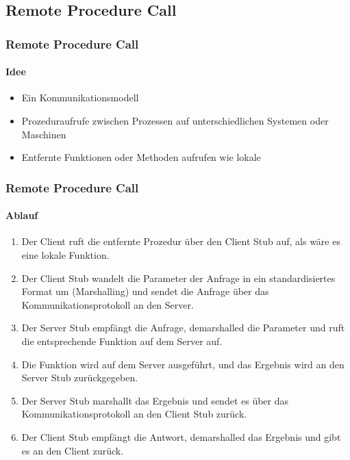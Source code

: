 \subsection{Remote Procedure Call}
\begin{frame}
  \frametitle{Remote Procedure Call}
  \framesubtitle{Idee}
  \begin{itemize}
    \item Ein Kommunikationsmodell
    \item Prozeduraufrufe zwischen Prozessen auf unterschiedlichen Systemen oder Maschinen
    \item Entfernte Funktionen oder Methoden aufrufen wie lokale
  \end{itemize}
\end{frame}


\begin{frame}
  \frametitle{Remote Procedure Call}
  \framesubtitle{Ablauf}
  \begin{enumerate} 
  \item Der Client ruft die entfernte Prozedur über den Client Stub auf, als wäre es eine lokale Funktion.
  \item Der Client Stub wandelt die Parameter der Anfrage in ein standardisiertes Format um (Marshalling) und sendet die Anfrage über das Kommunikationsprotokoll an den Server.
  \item Der Server Stub empfängt die Anfrage, demarshalled die Parameter und ruft die entsprechende Funktion auf dem Server auf.
  \item Die Funktion wird auf dem Server ausgeführt, und das Ergebnis wird an den Server Stub zurückgegeben.
  \item Der Server Stub marshallt das Ergebnis und sendet es über das Kommunikationsprotokoll an den Client Stub zurück.
  \item Der Client Stub empfängt die Antwort, demarshalled das Ergebnis und gibt es an den Client zurück.
  \end{enumerate}
\end{frame}

